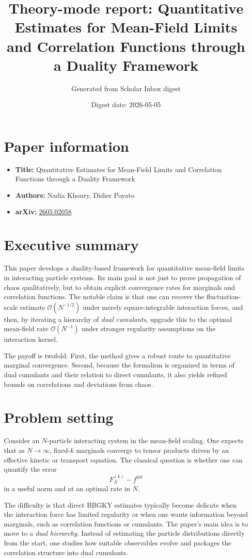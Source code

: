 \documentclass[11pt]{article}
\title{\textbf{Theory-mode report: Quantitative Estimates for Mean-Field Limits and Correlation Functions through a Duality Framework}}
\author{Generated from Scholar Inbox digest}
\date{Digest date: 2026-05-05}
\begin{document}
\maketitle
\section*{Paper information}
\begin{itemize}[leftmargin=1.5em]
\item \textbf{Title:} Quantitative Estimates for Mean-Field Limits and Correlation Functions through a Duality Framework
\item \textbf{Authors:} Nadia Khoury, Didier Poyato
\item \textbf{arXiv:} \href{https://arxiv.org/abs/2605.02058}{2605.02058}
\end{itemize}
\section*{Executive summary}
This paper develops a duality-based framework for quantitative mean-field limits in interacting particle systems. Its main goal is not just to prove propagation of chaos qualitatively, but to obtain explicit convergence rates for marginals and correlation functions. The notable claim is that one can recover the fluctuation-scale estimate $\mathcal O(N^{-1/2})$ under merely square-integrable interaction forces, and then, by iterating a hierarchy of \emph{dual cumulants}, upgrade this to the optimal mean-field rate $\mathcal O(N^{-1})$ under stronger regularity assumptions on the interaction kernel.

The payoff is twofold. First, the method gives a robust route to quantitative marginal convergence. Second, because the formalism is organized in terms of dual cumulants and their relation to direct cumulants, it also yields refined bounds on correlations and deviations from chaos.
\section*{Problem setting}
Consider an $N$-particle interacting system in the mean-field scaling. One expects that as $N\to\infty$, fixed-$k$ marginals converge to tensor products driven by an effective kinetic or transport equation. The classical question is whether one can quantify the error
\[
F_N^{(k)} - f^{\otimes k}
\]
in a useful norm and at an optimal rate in $N$.

The difficulty is that direct BBGKY estimates typically become delicate when the interaction force has limited regularity or when one wants information beyond marginals, such as correlation functions or cumulants. The paper's main idea is to move to a \emph{dual hierarchy}. Instead of estimating the particle distributions directly from the start, one studies how suitable observables evolve and packages the correlation structure into dual cumulants.
\end{document}
